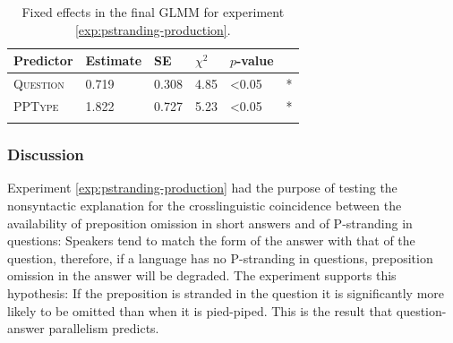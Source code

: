 \begin{table}[t]
\begin{tabular}{l l l l l l}
\lsptoprule
Predictor & Estimate & SE & $\chi^2$ &  $p$-value &  \\   
\midrule
\textsc{Question} & 0.719 &  0.308 & 4.85 & \textless 0.05 & * \\
\textsc{PPType} & 1.822 &     0.727 &   5.23 &  \textless 0.05 & *\\
\lspbottomrule
\end{tabular}
\caption{Fixed effects in the final GLMM for experiment \ref{exp:pstranding-production}.\label{tab:pstranding-production-estimates}}
\end{table}

\subsubsection{Discussion}
Experiment \ref{exp:pstranding-production} had the purpose of testing the nonsyntactic explanation for the crosslinguistic coincidence between the availability of preposition omission in short answers and of P-stranding in questions: Speakers tend to match the form of the answer with that of the question, therefore, if a language has no P-strand\-ing in questions, preposition omission in the answer will be degraded. The experiment supports this hypothesis: If the preposition is stranded in the question it is significantly more likely to be omitted than when it is pied-piped. This is the result that question-answer parallelism predicts.

